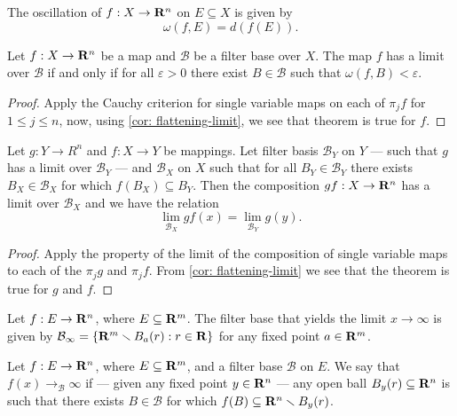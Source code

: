 \begin{definition}[Oscillation]
  The oscillation of \(f: X \to \mathbf{R}^n\) on \(E \subseteq X\) is given by
  \[
    \omega(f, E) = d(f(E)).
  \]
\end{definition}

\begin{theorem}
  \label{thm: cauchy-criterion several}
  Let \(f: X \to \mathbf{R}^n\) be a map and \(\mathcal B\) be a filter base over \(X\).
  The map \(f\) has a limit over \(\mathcal B\) if and only if for all
  \(\varepsilon > 0\) there exist \(B \in \mathcal B\) such that \(\omega(f, B)
  < \varepsilon\).
\end{theorem}

\begin{proof}
  Apply the Cauchy criterion for single variable maps on each of \(\pi_j  f\) for
  \(1 \leq j \leq n\), now, using \cref{cor: flattening-limit}, we see that theorem
  is true for \(f\).
\end{proof}

\begin{theorem}
  Let \(g: Y \to R^n\) and \(f: X \to Y\) be mappings. Let filter basis
  \(\mathcal B_Y\) on \(Y\) --- such that \(g\) has a limit over \(\mathcal
  B_Y\) --- and \(\mathcal B_X\) on \(X\) such that for all \(B_Y \in \mathcal
  B_Y\) there exists \(B_X \in \mathcal B_X\) for which \(f(B_X) \subseteq
  B_Y\). Then the composition \(g  f: X \to \mathbf{R}^n\) has a limit over
  \(\mathcal B_X\) and we have the relation
  \[
    \lim_{\mathcal B_X} g  f (x) = \lim_{\mathcal B_Y} g(y).
  \]
\end{theorem}

\begin{proof}
  Apply the property of the limit of the composition of single variable maps to
  each of the \(\pi_j  g\) and \(\pi_j  f\). From \cref{cor: flattening-limit} we
see that the theorem is true for \(g\) and \(f\).
\end{proof}

\begin{definition}
  Let \(f: E \to \mathbf{R}^n\), where \(E \subseteq \mathbf{R}^m\). The filter base that yields
  the limit \(x \to \infty\) is given by \(\mathcal B_\infty = \{\mathbf{R}^m \smallsetminus
  B_a(r) : r \in \mathbf{R}\}\) for any fixed point \(a \in \mathbf{R}^m\).
\end{definition}

\begin{definition}
  Let \(f: E \to \mathbf{R}^n\), where \(E \subseteq \mathbf{R}^m\), and a filter base
  \(\mathcal B\) on \(E\). We say that \(f(x) \to_\mathcal{B} \infty\) if ---
  given any fixed point \(y \in \mathbf{R}^n\) --- any open ball \(B_y(r) \subseteq
  \mathbf{R}^n\) is such that there exists \(B \in \mathcal B\) for which \(f(B)
  \subseteq \mathbf{R}^n \smallsetminus B_y(r)\).
\end{definition}

